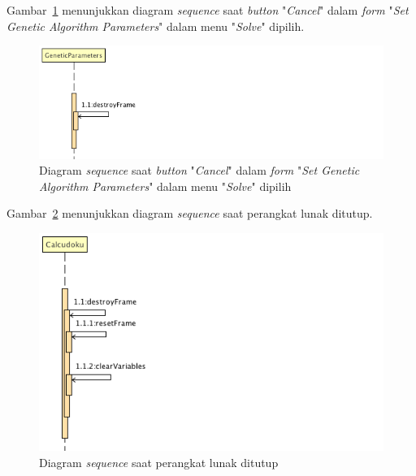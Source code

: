 Gambar~\ref{fig:sequencegaparameterscancel} menunjukkan diagram \textit{sequence} saat \textit{button} "\textit{Cancel}" dalam \textit{form} "\textit{Set Genetic Algorithm Parameters}" dalam menu "\textit{Solve}" dipilih.

\begin{figure}
\centering
\captionsetup{justification=centering}
\includegraphics[scale=0.5]{Gambar/Analisis/SequenceDiagramGeneticParametersCancel.png}
\caption[Diagram \textit{sequence} saat \textit{button} "\textit{Cancel}" dalam \textit{form} "\textit{Set Genetic Algorithm Parameters}" dalam menu "\textit{Solve}" dipilih]{Diagram \textit{sequence} saat \textit{button} "\textit{Cancel}" dalam \textit{form} "\textit{Set Genetic Algorithm Parameters}" dalam menu "\textit{Solve}" dipilih}
\label{fig:sequencegaparameterscancel}
\end{figure}

Gambar~\ref{fig:sequenceexit} menunjukkan diagram \textit{sequence} saat perangkat lunak ditutup.

\begin{figure}
\centering
\captionsetup{justification=centering}
\includegraphics[scale=0.5]{Gambar/Analisis/SequenceDiagramExit.png}
\caption[Diagram \textit{sequence} saat perangkat lunak ditutup]{Diagram \textit{sequence} saat perangkat lunak ditutup}
\label{fig:sequenceexit}
\end{figure}